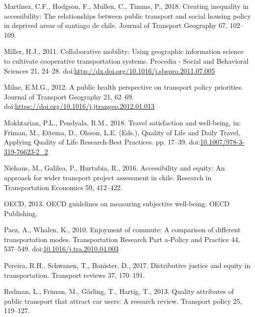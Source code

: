 \documentclass[]{elsarticle} %
\begin{document}
\leavevmode\hypertarget{ref-Figueroa2018}{}%
Martínez, C.F., Hodgson, F., Mullen, C., Timms, P., 2018. Creating
inequality in accessibility: The relationships between public transport
and social housing policy in deprived areas of santiago de chile.
Journal of Transport Geography 67, 102--109.

\leavevmode\hypertarget{ref-Miller2011collaborative}{}%
Miller, H.J., 2011. Collaborative mobility: Using geographic information
science to cultivate cooperative transportation systems. Procedia -
Social and Behavioral Sciences 21, 24--28.
doi:\href{https://doi.org/http://dx.doi.org/10.1016/j.sbspro.2011.07.005}{http://dx.doi.org/10.1016/j.sbspro.2011.07.005}

\leavevmode\hypertarget{ref-Milne2012public}{}%
Milne, E.M.G., 2012. A public health perspective on transport policy
priorities. Journal of Transport Geography 21, 62--69.
doi:\href{https://doi.org/https://doi.org/10.1016/j.jtrangeo.2012.01.013}{https://doi.org/10.1016/j.jtrangeo.2012.01.013}

\leavevmode\hypertarget{ref-Mokhtarian2018travel}{}%
Mokhtarian, P.L., Pendyala, R.M., 2018. Travel satisfaction and
well-being, in: Friman, M., Ettema, D., Olsson, L.E. (Eds.), Quality of
Life and Daily Travel, Applying Quality of Life Research-Best Practices.
pp. 17--39.
doi:\href{https://doi.org/10.1007/978-3-319-76623-2_2}{10.1007/978-3-319-76623-2\_2}

\leavevmode\hypertarget{ref-Niehaus2016}{}%
Niehaus, M., Galilea, P., Hurtubia, R., 2016. Accessibility and equity:
An approach for wider transport project assessment in chile. Research in
Transportation Economics 59, 412--422.

\leavevmode\hypertarget{ref-oecd2013oecd}{}%
OECD, 2013. OECD guidelines on measuring subjective well-being. OECD
Publishing.

\leavevmode\hypertarget{ref-Paez2010enjoyment}{}%
Paez, A., Whalen, K., 2010. Enjoyment of commute: A comparison of
different transportation modes. Transportation Research Part a-Policy
and Practice 44, 537--549.
doi:\href{https://doi.org/10.1016/j.tra.2010.04.003}{10.1016/j.tra.2010.04.003}

\leavevmode\hypertarget{ref-Pereira2017distributive}{}%
Pereira, R.H., Schwanen, T., Banister, D., 2017. Distributive justice
and equity in transportation. Transport reviews 37, 170--191.

\leavevmode\hypertarget{ref-Redman2013quality}{}%
Redman, L., Friman, M., Gärling, T., Hartig, T., 2013. Quality
attributes of public transport that attract car users: A research
review. Transport policy 25, 119--127.
\end{document}
